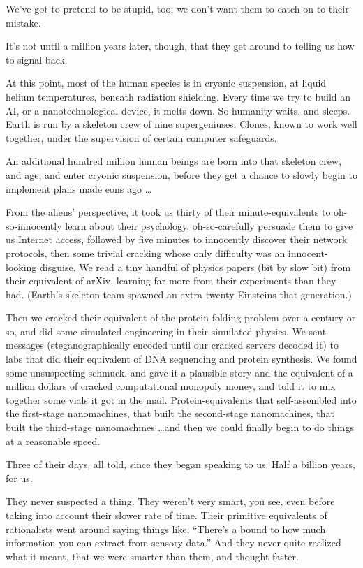 {
 We've got to pretend to be stupid, too; we
don't want them to catch on to their mistake.}

{
 It's not until a million years later, though, that
they get around to telling us how to signal back.}

{
 At this point, most of the human species is in cryonic suspension,
at liquid helium temperatures, beneath radiation shielding. Every time
we try to build an AI, or a nanotechnological device, it melts down. So
humanity waits, and sleeps. Earth is run by a skeleton crew of nine
supergeniuses. Clones, known to work well together, under the
supervision of certain computer safeguards.}

{
 An additional hundred million human beings are born into that
skeleton crew, and age, and enter cryonic suspension, before they get a
chance to slowly begin to implement plans made eons ago \ldots}

{
 From the aliens' perspective, it took us thirty of
their minute-equivalents to oh-so-innocently learn about their
psychology, oh-so-carefully persuade them to give us Internet access,
followed by five minutes to innocently discover their network
protocols, then some trivial cracking whose only difficulty was an
innocent-looking disguise. We read a tiny handful of physics papers
(bit by slow bit) from their equivalent of arXiv, learning far more
from their experiments than they had. (Earth's skeleton
team spawned an extra twenty Einsteins that generation.)}

{
 Then we cracked their equivalent of the protein folding problem
over a century or so, and did some simulated engineering in their
simulated physics. We sent messages (steganographically encoded until
our cracked servers decoded it) to labs that did their equivalent of
DNA sequencing and protein synthesis. We found some unsuspecting
schmuck, and gave it a plausible story and the equivalent of a million
dollars of cracked computational monopoly money, and told it to mix
together some vials it got in the mail. Protein-equivalents that
self-assembled into the first-stage nanomachines, that built the
second-stage nanomachines, that built the third-stage nanomachines
\ldots and then we could finally begin to do things at a reasonable
speed.}

{
 Three of their days, all told, since they began speaking to us.
Half a billion years, for us.}

{
 They never suspected a thing. They weren't very
smart, you see, even before taking into account their slower rate of
time. Their primitive equivalents of rationalists went around saying
things like, ``There's a bound to how
much information you can extract from sensory data.''
And they never quite realized what it meant, that we were smarter than
them, and thought faster.}

